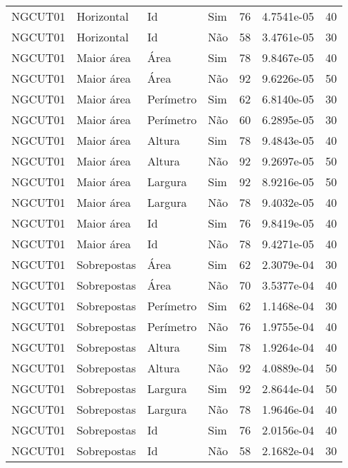 \begin{tabular}{llllrrr}
    NGCUT01   & Horizontal  & Id        & Sim         & 76           & 4.7541e-05 & 40       \\
    NGCUT01   & Horizontal  & Id        & Não         & 58           & 3.4761e-05 & 30       \\
    NGCUT01   & Maior área  & Área      & Sim         & 78           & 9.8467e-05 & 40       \\
    NGCUT01   & Maior área  & Área      & Não         & 92           & 9.6226e-05 & 50       \\
    NGCUT01   & Maior área  & Perímetro & Sim         & 62           & 6.8140e-05 & 30       \\
    NGCUT01   & Maior área  & Perímetro & Não         & 60           & 6.2895e-05 & 30       \\
    NGCUT01   & Maior área  & Altura    & Sim         & 78           & 9.4843e-05 & 40       \\
    NGCUT01   & Maior área  & Altura    & Não         & 92           & 9.2697e-05 & 50       \\
    NGCUT01   & Maior área  & Largura   & Sim         & 92           & 8.9216e-05 & 50       \\
    NGCUT01   & Maior área  & Largura   & Não         & 78           & 9.4032e-05 & 40       \\
    NGCUT01   & Maior área  & Id        & Sim         & 76           & 9.8419e-05 & 40       \\
    NGCUT01   & Maior área  & Id        & Não         & 78           & 9.4271e-05 & 40       \\
    NGCUT01   & Sobrepostas & Área      & Sim         & 62           & 2.3079e-04 & 30       \\
    NGCUT01   & Sobrepostas & Área      & Não         & 70           & 3.5377e-04 & 40       \\
    NGCUT01   & Sobrepostas & Perímetro & Sim         & 62           & 1.1468e-04 & 30       \\
    NGCUT01   & Sobrepostas & Perímetro & Não         & 76           & 1.9755e-04 & 40       \\
    NGCUT01   & Sobrepostas & Altura    & Sim         & 78           & 1.9264e-04 & 40       \\
    NGCUT01   & Sobrepostas & Altura    & Não         & 92           & 4.0889e-04 & 50       \\
    NGCUT01   & Sobrepostas & Largura   & Sim         & 92           & 2.8644e-04 & 50       \\
    NGCUT01   & Sobrepostas & Largura   & Não         & 78           & 1.9646e-04 & 40       \\
    NGCUT01   & Sobrepostas & Id        & Sim         & 76           & 2.0156e-04 & 40       \\
    NGCUT01   & Sobrepostas & Id        & Não         & 58           & 2.1682e-04 & 30       \\
    \hline
\end{tabular}